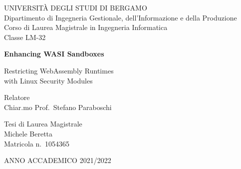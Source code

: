 \begin{titlepage}
  \begin{center}
    \large
    UNIVERSITÀ DEGLI STUDI DI BERGAMO \\
    \vspace{0.5cm}
    \normalsize
    Dipartimento di Ingegneria Gestionale, dell'Informazione e della Produzione \\
    Corso di Laurea Magistrale in Ingegneria Informatica \\
    Classe LM-32

    \vfill

    \Huge
    \textbf{Enhancing WASI Sandboxes}

    \LARGE
    Restricting WebAssembly Runtimes \\ with Linux Security Modules
  \end{center}

  \vfill

  \begin{flushleft}
    Relatore \\
    Chiar.mo Prof.~Stefano Paraboschi
  \end{flushleft}

  \begin{flushright}
    Tesi di Laurea Magistrale \\
    Michele Beretta \\
    Matricola n.~1054365
  \end{flushright}

  \vfill

  \begin{center}
    ANNO ACCADEMICO 2021/2022
  \end{center}
\end{titlepage}